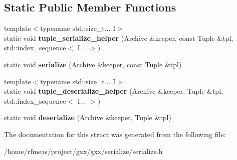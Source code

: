 \subsection*{Static Public Member Functions}
\begin{DoxyCompactItemize}
\item 
{\footnotesize template$<$typename std\+::size\+\_\+t... I$>$ }\\static void {\bfseries tuple\+\_\+serialize\+\_\+helper} (Archive \&keeper, const Tuple \&tpl, std\+::index\+\_\+sequence$<$ I... $>$)\hypertarget{structgxx_1_1serialize__helper_3_01Archive_00_01std_1_1tuple_3_01Args_8_8_8_01_4_01_4_a72483c0130ccf3ec626234ed5931dbd1}{}\label{structgxx_1_1serialize__helper_3_01Archive_00_01std_1_1tuple_3_01Args_8_8_8_01_4_01_4_a72483c0130ccf3ec626234ed5931dbd1}

\item 
static void {\bfseries serialize} (Archive \&keeper, const Tuple \&tpl)\hypertarget{structgxx_1_1serialize__helper_3_01Archive_00_01std_1_1tuple_3_01Args_8_8_8_01_4_01_4_aea5bd89e84bd2ce7f007899a7fb7a454}{}\label{structgxx_1_1serialize__helper_3_01Archive_00_01std_1_1tuple_3_01Args_8_8_8_01_4_01_4_aea5bd89e84bd2ce7f007899a7fb7a454}

\item 
{\footnotesize template$<$typename std\+::size\+\_\+t... I$>$ }\\static void {\bfseries tuple\+\_\+deserialize\+\_\+helper} (Archive \&keeper, Tuple \&tpl, std\+::index\+\_\+sequence$<$ I... $>$)\hypertarget{structgxx_1_1serialize__helper_3_01Archive_00_01std_1_1tuple_3_01Args_8_8_8_01_4_01_4_a3091432944da3fee762c90941ca05560}{}\label{structgxx_1_1serialize__helper_3_01Archive_00_01std_1_1tuple_3_01Args_8_8_8_01_4_01_4_a3091432944da3fee762c90941ca05560}

\item 
static void {\bfseries deserialize} (Archive \&keeper, Tuple \&tpl)\hypertarget{structgxx_1_1serialize__helper_3_01Archive_00_01std_1_1tuple_3_01Args_8_8_8_01_4_01_4_a200a8f687443dd65f868b76a6290a05a}{}\label{structgxx_1_1serialize__helper_3_01Archive_00_01std_1_1tuple_3_01Args_8_8_8_01_4_01_4_a200a8f687443dd65f868b76a6290a05a}

\end{DoxyCompactItemize}


The documentation for this struct was generated from the following file\+:\begin{DoxyCompactItemize}
\item 
/home/rfmeas/project/gxx/gxx/serialize/serialize.\+h\end{DoxyCompactItemize}
